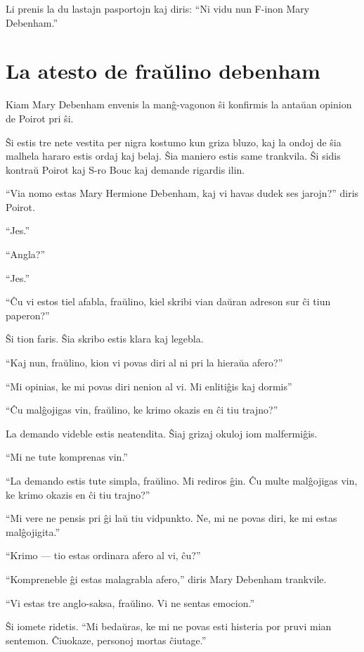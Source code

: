 Li prenis la du lastajn pasportojn kaj diris: ``Ni vidu nun F-inon Mary Debenham.''

\chapter[La atesto de fraŭlino debenham]{La atesto de fraŭlino debenham}


Kiam Mary Debenham envenis la manĝ-vagonon ŝi konfirmis la antaŭan opinion de Poirot pri ŝi.

Ŝi estis tre nete vestita per nigra kostumo kun griza bluzo, kaj la ondoj de ŝia malhela hararo estis ordaj kaj belaj. Ŝia maniero estis same trankvila. Ŝi sidis kontraŭ Poirot kaj S-ro Bouc kaj demande rigardis ilin.

``Via nomo estas Mary Hermione Debenham, kaj vi havas dudek ses jarojn?'' diris Poirot.

``Jes.''

``Angla?''

``Jes.''

``Ĉu vi estos tiel afabla, fraŭlino, kiel skribi vian daŭran adreson sur ĉi tiun paperon?''

Ŝi tion faris. Ŝia skribo estis klara kaj legebla.

``Kaj nun, fraŭlino, kion vi povas diri al ni pri la hieraŭa afero?''

``Mi opinias, ke mi povas diri nenion al vi. Mi enlitiĝis kaj dormis''

``Ĉu malĝojigas vin, fraŭlino, ke krimo okazis en ĉi tiu trajno?''

La demando videble estis neatendita. Ŝiaj grizaj okuloj iom malfermiĝis.

``Mi ne tute komprenas vin.''

``La demando estis tute simpla, fraŭlino. Mi rediros ĝin. Ĉu multe malĝojigas vin, ke krimo okazis en ĉi tiu trajno?''

``Mi vere ne pensis pri ĝi laŭ tiu vidpunkto. Ne, mi ne povas diri, ke mi estas malĝojigita.''

``Krimo --- tio estas ordinara afero al vi, ĉu?''

``Kompreneble ĝi estas malagrabla afero,'' diris Mary Debenham trankvile.

``Vi estas tre anglo-saksa, fraŭlino. Vi ne sentas emocion.''

Ŝi iomete ridetis. ``Mi bedaŭras, ke mi ne povas esti histeria por pruvi mian sentemon. Ĉiuokaze, personoj mortas ĉiutage.''

